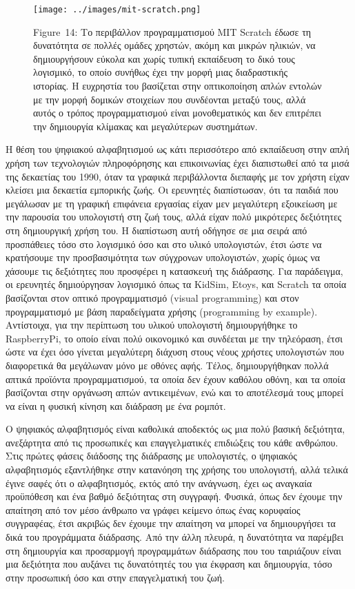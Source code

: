 \documentclass[
]{article}
\begin{document}
\leavevmode{}%
\begin{figure}
\hypertarget{fig:mit-scratch}{%
\centering
\texttt{[image: ../images/mit-scratch.png]}
\caption{Figure~14: Το περιβάλλον προγραμματισμού MIT Scratch έδωσε τη
δυνατότητα σε πολλές ομάδες χρηστών, ακόμη και μικρών ηλικιών, να
δημιουργήσουν εύκολα και χωρίς τυπική εκπαίδευση το δικό τους λογισμικό,
το οποίο συνήθως έχει την μορφή μιας διαδραστικής ιστορίας. Η ευχρηστία
του βασίζεται στην οπτικοποίηση απλών εντολών με την μορφή δομικών
στοιχείων που συνδέονται μεταξύ τους, αλλά αυτός ο τρόπος
προγραμματισμού είναι μονοθεματικός και δεν επιτρέπει την δημιουργία
κλίμακας και μεγαλύτερων συστημάτων.}\label{fig:mit-scratch}
}
\end{figure}

Η θέση του ψηφιακού αλφαβητισμού ως κάτι περισσότερο από εκπαίδευση στην
απλή χρήση των τεχνολογιών πληροφόρησης και επικοινωνίας έχει
διαπιστωθεί από τα μισά της δεκαετίας του 1990, όταν τα γραφικά
περιβάλλοντα διεπαφής με τον χρήστη είχαν κλείσει μια δεκαετία εμπορικής
ζωής. Οι ερευνητές διαπίστωσαν, ότι τα παιδιά που μεγάλωσαν με τη
γραφική επιφάνεια εργασίας είχαν μεν μεγαλύτερη εξοικείωση με την
παρουσία του υπολογιστή στη ζωή τους, αλλά είχαν πολύ μικρότερες
δεξιότητες στη δημιουργική χρήση του. Η διαπίστωση αυτή οδήγησε σε μια
σειρά από προσπάθειες τόσο στο λογισμικό όσο και στο υλικό υπολογιστών,
έτσι ώστε να κρατήσουμε την προσβασιμότητα των σύγχρονων υπολογιστών,
χωρίς όμως να χάσουμε τις δεξιότητες που προσφέρει η κατασκευή της
διάδρασης. Για παράδειγμα, οι ερευνητές δημιούργησαν λογισμικό όπως τα
KidSim, Etoys, και Scratch τα οποία βασίζονται στον οπτικό
προγραμματισμό (visual programming) και στον προγραμματισμό με βάση
παραδείγματα χρήσης (programming by example). Αντίστοιχα, για την
περίπτωση του υλικού υπολογιστή δημιουργήθηκε το RaspberryPi, το οποίο
είναι πολύ οικονομικό και συνδέεται με την τηλεόραση, έτσι ώστε να έχει
όσο γίνεται μεγαλύτερη διάχυση στους νέους χρήστες υπολογιστών που
διαφορετικά θα μεγάλωναν μόνο με οθόνες αφής. Τέλος, δημιουργήθηκαν
πολλά απτικά προϊόντα προγραμματισμού, τα οποία δεν έχουν καθόλου οθόνη,
και τα οποία βασίζονται στην οργάνωση απτών αντικειμένων, ενώ και το
αποτέλεσμά τους μπορεί να είναι η φυσική κίνηση και διάδραση με ένα
ρομπότ.

Ο ψηφιακός αλφαβητισμός είναι καθολικά αποδεκτός ως μια πολύ βασική
δεξιότητα, ανεξάρτητα από τις προσωπικές και επαγγελματικές επιδιώξεις
του κάθε ανθρώπου. Στις πρώτες φάσεις διάδοσης της διάδρασης με
υπολογιστές, ο ψηφιακός αλφαβητισμός εξαντλήθηκε στην κατανόηση της
χρήσης του υπολογιστή, αλλά τελικά έγινε σαφές ότι ο αλφαβητισμός, εκτός
από την ανάγνωση, έχει ως αναγκαία προϋπόθεση και ένα βαθμό δεξιότητας
στη συγγραφή. Φυσικά, όπως δεν έχουμε την απαίτηση από τον μέσο άνθρωπο
να γράφει κείμενο όπως ένας κορυφαίος συγγραφέας, έτσι ακριβώς δεν
έχουμε την απαίτηση να μπορεί να δημιουργήσει τα δικά του προγράμματα
διάδρασης. Από την άλλη πλευρά, η δυνατότητα να παρέμβει στη δημιουργία
και προσαρμογή προγραμμάτων διάδρασης που του ταιριάζουν είναι μια
δεξιότητα που αυξάνει τις δυνατότητές του για έκφραση και δημιουργία,
τόσο στην προσωπική όσο και στην επαγγελματική του ζωή.
\end{document}
